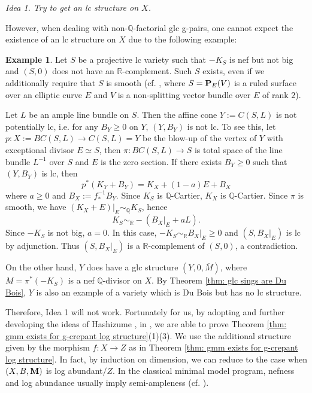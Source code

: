 \documentclass[11pt]{amsart}
\numberwithin{equation}{section}
\newcommand{\Mm}{{\bf{M}}}
\newcommand{\PP}{{\bf{P}}}
\newcommand{\Qq}{\mathbb{Q}}
\newcommand{\Rr}{\mathbb{R}}
\theoremstyle{definition}
\theoremstyle{definition}
\newtheorem{ex}[thm]{Example}
\theoremstyle{definition}
\begin{document}
\smallskip

\noindent\textit{Idea 1. Try to get an lc structure on $X$.}

\smallskip

However, when dealing with non-$\mathbb Q$-factorial glc g-pairs, one
cannot expect the existence of an lc structure on $X$ due to the
following example:

\begin{ex}\label{ex: glc not lc}
  Let $S$ be a projective lc variety such that $-K_S$ is nef but not
  big and $(S,0)$ does not have an $\mathbb R$-complement. Such $S$
  exists, even if we additionally require that $S$ is smooth (cf.
    \cite[1.1 Example]{Sho00}, where $S=\PP_E(V)$ is a ruled surface
    over an elliptic curve $E$ and $V$ is a non-splitting vector bundle
  over $E$ of rank $2$).

  Let $L$ be an ample line bundle on $S$. Then the affine cone
  $Y:=C(S,L)$ is not potentially lc, i.e. for any $B_Y\geq 0$ on $Y$,
  $(Y,B_Y)$ is not lc. To see this, let $p:X:=BC(S,L)\to C(S,L)=Y$ be
  the blow-up of the vertex of $Y$ with exceptional divisor $E\simeq
  S$, then $\pi:BC(S,L)\to S$ is total space of the line bundle
  $L^{-1}$ over $S$ and $E$ is the zero section. If there exists
  $B_Y\ge0$ such that $(Y,B_Y)$ is lc, then
  $$
  p^*(K_Y+B_Y)=K_X+(1-a)E+B_X
  $$
  where $a\geq 0$ and $B_X:=f^{-1}_*B_Y$. Since $K_S$ is $\mathbb
  Q$-Cartier, $K_X$ is $\Qq$-Cartier. Since $\pi$ is smooth, we have
  $(K_X+E)|_E\sim_{\Qq} K_S$, hence
  $$
  K_S\sim_{\Rr}-(B_X|_{E}+aL).
  $$
  Since $-K_S$ is not big, $a=0$. In this case,
  $-K_S\sim_{\Rr}B_X|_{E}\ge0$ and $(S,B_X|_E)$ is lc by adjunction.
  Thus $(S,B_X|_E)$ is a $\Rr$-complement of $(S,0)$, a contradiction.

  On the other hand, $Y$ does have a glc structure
  $(Y,0,\overline{M})$, where $M=\pi^*(-K_S)$ is a nef $\mathbb
  Q$-divisor on $X$. By Theorem \ref{thm: glc sings are Du Bois}, $Y$
  is also an example of a variety which is Du Bois but has no lc structure.

\end{ex}

Therefore, Idea 1 will not work. Fortunately for us, by adopting and
further developing the ideas of Hashizume \cite{Has20b,Has22}, in
\cite{LX22}, we are able to prove Theorem \ref{thm: gmm exists for
g-crepant log structure}(1)(3). We use the additional structure given
by the morphism $f: X\rightarrow Z$ as in Theorem \ref{thm: gmm
exists for g-crepant log structure}. In fact, by induction on
dimension, we can reduce to the case when $(X,B,\Mm)$ is log
abundant$/Z$. In the classical minimal model program, nefness and log
abundance usually imply semi-ampleness (cf. \cite{FG14,HX16,Has20a}).
\end{document}
